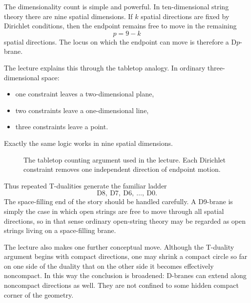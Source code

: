 The dimensionality count is simple and powerful. In ten-dimensional string theory there are nine spatial dimensions. If \(k\) spatial directions are fixed by Dirichlet conditions, then the endpoint remains free to move in the remaining
\begin{equation}
p=9-k
\end{equation}
spatial directions. The locus on which the endpoint can move is therefore a D\(p\)-brane.

The lecture explains this through the tabletop analogy. In ordinary three-dimensional space:
\begin{itemize}
\item one constraint leaves a two-dimensional plane,
\item two constraints leave a one-dimensional line,
\item three constraints leave a point.
\end{itemize}
Exactly the same logic works in nine spatial dimensions.

\begin{figure}[htbp]
\centering
{}
\caption{The tabletop counting argument used in the lecture. Each Dirichlet constraint removes one independent direction of endpoint motion.}
\end{figure}

Thus repeated T-dualities generate the familiar ladder
\begin{equation}
\text{D}8,\ \text{D}7,\ \text{D}6,\ \dots,\ \text{D}0.
\end{equation}
The space-filling end of the story should be handled carefully. A D9-brane is simply the case in which open strings are free to move through all spatial directions, so in that sense ordinary open-string theory may be regarded as open strings living on a space-filling brane.

The lecture also makes one further conceptual move. Although the T-duality argument begins with compact directions, one may shrink a compact circle so far on one side of the duality that on the other side it becomes effectively noncompact. In this way the conclusion is broadened: D-branes can extend along noncompact directions as well. They are not confined to some hidden compact corner of the geometry.

